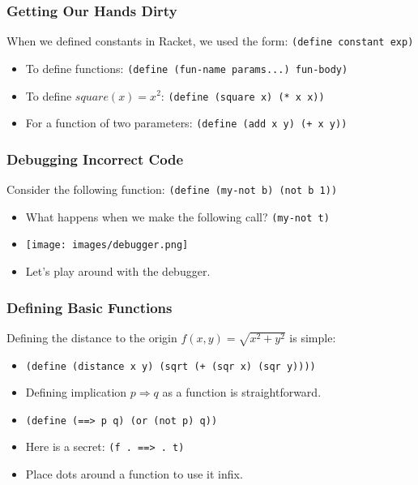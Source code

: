 \documentclass{beamer}
\begin{document}
\begin{frame}
  \frametitle{Getting Our Hands Dirty}
  When we defined constants in Racket, we used the form:
  \texttt{(define constant exp)}
  \begin{itemize}
  \item<2-> To define functions: \texttt{(define (fun-name params...) fun-body)}
  \item<3-> To define $square(x) = x^2$:
    \texttt{(define (square x) (* x x))}
  \item<4-> For a function of two parameters:
    \texttt{(define (add x y) (+ x y))}
  \end{itemize}
\end{frame}

\begin{frame}
  \frametitle{Debugging Incorrect Code}
  Consider the following function:
  \texttt{(define (my-not b) (not b 1))}
  \begin{itemize}
  \item<2-> What happens when we make the following call? \texttt{(my-not t)}
  \item<3-> \texttt{[image: images/debugger.png]}
  \item<4-> Let's play around with the debugger.
  \end{itemize}
\end{frame}

\begin{frame}
  \frametitle{Defining Basic Functions}
  Defining the distance to the origin $f(x, y) = \sqrt{x^2 + y^2}$ is simple:
  \begin{itemize}
  \item<2-> \texttt{(define (distance x y) (sqrt (+ (sqr x) (sqr y))))}
  \item<3-> Defining implication $p \Rightarrow q$ as a function is straightforward.
  \item<4-> \texttt{(define (==> p q) (or (not p) q))}
  \item<5-> Here is a secret: \texttt{(f . ==> . t)}
  \item<6-> Place dots around a function to use it infix.    
  \end{itemize}
\end{frame}
\end{document}
